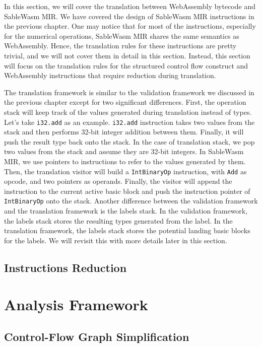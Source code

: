 In this section, we will cover the translation between WebAssembly bytecode and SableWasm MIR. We have covered the design of SableWasm MIR instructions in the previous chapter. One may notice that for most of the instructions, especially for the numerical operations, SableWasm MIR shares the same semantics as WebAssembly. Hence, the translation rules for these instructions are pretty trivial, and we will not cover them in detail in this section. Instead, this section will focus on the translation rules for the structured control flow construct and WebAssembly instructions that require reduction during translation.

The translation framework is similar to the validation framework we discussed in the previous chapter except for two significant differences. First, the operation stack will keep track of the values generated during translation instead of types. Let's take \texttt{i32.add} as an example. \texttt{i32.add} instruction takes two values from the stack and then performs 32-bit integer addition between them. Finally, it will push the result type back onto the stack. In the case of translation stack, we pop two values from the stack and assume they are 32-bit integers. In SableWasm MIR, we use pointers to instructions to refer to the values generated by them. Then, the translation visitor will build a \texttt{IntBinaryOp} instruction, with \texttt{Add} as opcode, and two pointers as operands. Finally, the visitor will append the instruction to the current active basic block and push the instruction pointer of \texttt{IntBinaryOp} onto the stack. Another difference between the validation framework and the translation framework is the labels stack. In the validation framework, the labels stack stores the resulting types generated from the label. In the translation framework, the labels stack stores the potential landing basic blocks for the labels. We will revisit this with more details later in this section.



\subsection{Instructions Reduction}

\section{Analysis Framework}

\subsection{Control-Flow Graph Simplification}


